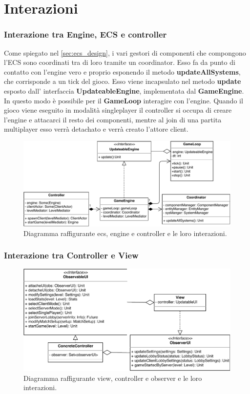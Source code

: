 \section{Interazioni}
\label{sec:interactions_design}

\subsubsection{Interazione tra Engine, ECS e controller}
Come spiegato nel \ref{sec:ecs_design}, i vari gestori di componenti che compongono l'ECS sono coordinati tra di loro tramite un coordinator. Esso fa da punto di contatto con l'engine vero e proprio esponendo il metodo \textbf{updateAllSystems}, che corrisponde a un tick del gioco. Esso viene incapsulato nel metodo \textbf{update} esposto dall' interfaccia \textbf{UpdateableEngine}, implementata dal \textbf{GameEngine}. In questo modo è possibile per il \textbf{GameLoop} interagire con l'engine.
Quando il gioco viene eseguito in modalità singleplayer il controller si occupa di creare l'engine e attacarci il resto dei componenti, mentre al join di una partita multiplayer esso verrà detachato e verrà creato l'attore client.
\begin{figure}[H]
	\centering
	\includegraphics[width=\columnwidth]{drawio/ECS-engine-controller/ecs-engine-controller.pdf}
	\caption{Diagramma raffigurante ecs, engine e controller e le loro interazioni.}
	\label{fig:ecsenginecontroller}
\end{figure}



\subsubsection{Interazione tra Controller e View}

\begin{figure}[H]
	\centering
	\includegraphics[width=\columnwidth]{drawio/view-controller-observer/view-controller-observer.pdf}
	\caption{Diagramma raffigurante view, controller e observer e le loro interazioni.}
	\label{fig:ecsenginecontroller}
\end{figure}